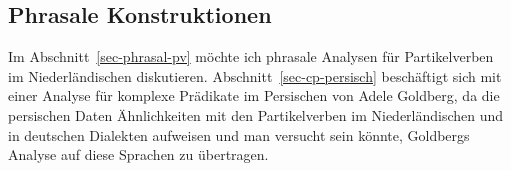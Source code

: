 \begin{comment}
Crysmann verweist darauf, dass bereits Kathol vorgeschlagen hat, 


A further disadvantage of Kathol's proposal is that the fact that the particle
verbs form a predicate complex is not represented in the \synsem part of their lexical entries:
The \vcompv of \emph{aufwachen} in (\ref{le-aufwachen-kathol}) is the empty list.
It is not obvious how the formation of resultative constructions with particle verbs like
in (\ref{ex-muede-herumliest})---repeated here as (\mex{1})---can be blocked.
\ea[\#]{
\gll dass  sich Karl müde  herumliest.\\
     that self Karl tired \partic(around).reads\\
\glt Intended: `that Karl gets tired by reading aimlessly.'
}
\z
In the analysis developed here, the particle is selected via \vcomp and the resultative
construction lexical rules require an input with an empty \vcomp list. Since
the \vcomp list of particle verbs contains the particle, it is correctly
predicted that particle verbs cannot be input to a lexical rule that
licenses resultative constructions. See page~\pageref{bsp-anloslacht2}.

Ein weiterer Nachteil von Kathols und Crysmanns Ansatz ist, dass die Tatsache,
dass Partikel und Verb einen Komplex bilden nicht in dem \type{synsem}"=Objekt
des Verbs repräsentiert ist. Im hier vorgestellten Ansatz ist die Partikel
als selegiertes Element in der \compsl des Verbs enthalten, in Kathols Ansatz
entspricht das \type{synsem}"=Objekt einem Simplexverb, und es ist deshalb nicht
klar wie man die Beschränkung erfassen will, dass bei der Partikelverbbildung

\end{comment}


%

\subsection{Phrasale Konstruktionen}

Im Abschnitt~\ref{sec-phrasal-pv} möchte ich phrasale Analysen für Partikelverben
im Niederländischen diskutieren. Abschnitt~\ref{sec-cp-persisch} beschäftigt sich mit 
einer Analyse für komplexe Prädikate im Persischen
von Adele Goldberg, da die persischen Daten Ähnlichkeiten mit den
Partikelverben im Niederländischen und in deutschen Dialekten aufweisen und
man versucht sein könnte, Goldbergs Analyse auf diese Sprachen zu übertragen.


